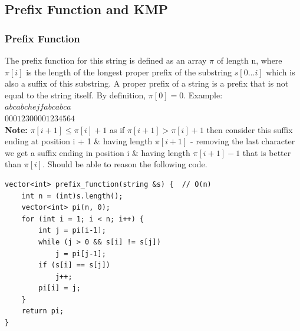 \documentclass[8pt, a4paper, oneside, twocolumn]{extarticle}
\begin{document}
\subsection{Prefix Function and KMP}
\subsubsection{Prefix Function}
The prefix function for this string is defined as an array $\pi$ of length n, where $\pi[i]$ is the length of the longest proper prefix of the substring $s[0 … i]$ which is also a suffix of this substring. A proper prefix of a string is a prefix that is not equal to the string itself. By definition, $\pi[0]=0$. Example:\\
$abcabchejfabcabca$\\
$00012300001234564$\\
\textbf{Note: } $\pi[i + 1] \leq \pi[i] + 1$ as if $\pi[i + 1] > \pi[i] + 1$ then consider this suffix ending at position i + 1 \& having length $\pi[i + 1]$ - removing the last character we get a suffix ending in position i \& having length $\pi[i + 1] - 1$ that is better than $\pi[i]$. Should be able to reason the following code.
\begin{verbatim}
vector<int> prefix_function(string &s) {  // O(n)
    int n = (int)s.length();
    vector<int> pi(n, 0);
    for (int i = 1; i < n; i++) {
        int j = pi[i-1];
        while (j > 0 && s[i] != s[j])
            j = pi[j-1];
        if (s[i] == s[j])
            j++;
        pi[i] = j;
    }
    return pi;
}
\end{verbatim}
\end{document}
